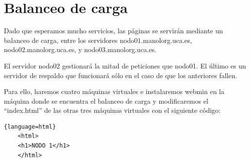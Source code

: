 \documentclass[12pt,letterpaper]{article}
\begin{document}
\section{Balanceo de carga}
Dado que esperamos mucho servicios, las páginas se servirán mediante un balanceo de carga, entre los servidores nodo01.manolorg.uca.es, nodo02.manolorg.uca.es, y nodo03.manolorg.uca.es.

El servidor nodo02 gestionará la mitad de peticiones que nodo01. El último es un servidor de respaldo que funcionará sólo en el caso de que los anteriores fallen.

Para ello, haremos cuatro máquinas virtuales e instalaremos webmin en la máquina donde se encuentra el balanceo de carga y modificaremos el ``index.html'' de las otras tres máquinas virtuales con el siguiente código:
\begin{lstlisting}{language=html}
	<html>
	<h1>NODO 1</h1>
	</html>
\end{lstlisting}
\end{document}
